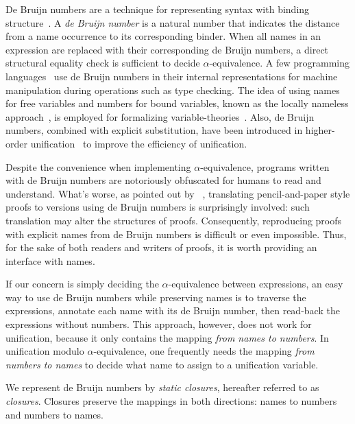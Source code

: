 \documentclass[a4paper,UKenglish]{lipics-v2016}
\begin{document}
De Bruijn numbers are a technique for representing syntax with binding
structure~\citep{de_bruijn_lambda_1972}.  A \emph{de Bruijn number} is
a natural number that indicates the distance from a name occurrence to
its corresponding binder.  When all names in an expression are
replaced with their corresponding de Bruijn numbers, a direct
structural equality check is sufficient to decide
$\alpha$-equivalence.  A few programming
languages~\citep{norell_towards_2007} use de Bruijn numbers in their
internal representations for machine manipulation during operations
such as type checking.  The idea of using names for free variables and
numbers for bound variables, known as the locally nameless
approach~\citep{chargueraud_locally_2012}, is employed for formalizing
variable-theories~\citep{aydemir_nominal_2006,
  aydemir_engineering_2008}.  Also, de Bruijn numbers, combined with
explicit substitution, have been introduced in higher-order
unification~\citep{dowek_higher_2000} to improve the efficiency of
unification.

Despite the convenience when implementing $\alpha$-equivalence,
programs written with de Bruijn numbers are notoriously obfuscated for
humans to read and understand.  What's worse, as pointed out by
~\citet{berghofer_head--head_2007}, translating
pencil-and-paper style proofs to versions using de Bruijn numbers is
surprisingly involved: such translation may alter the structures of
proofs.  Consequently, reproducing proofs with explicit names from de
Bruijn numbers is difficult or even impossible.  Thus, for the sake of
both readers and writers of proofs, it is worth providing an interface
with names.

If our concern is simply deciding the $\alpha$-equivalence between
expressions, an easy way to use de Bruijn numbers while preserving
names is to traverse the expressions, annotate each name with its de
Bruijn number, then read-back the expressions without numbers.  This
approach, however, does not work for unification, because it only
contains the mapping \emph{from names to numbers}.  In unification
modulo $\alpha$-equivalence, one frequently needs the mapping
\emph{from numbers to names} to decide what name to assign to a
unification variable.

We represent de Bruijn numbers by \emph{static closures},
hereafter referred to as \emph{closures}.  Closures preserve the
mappings in both directions: names to numbers and numbers to names.
\end{document}
